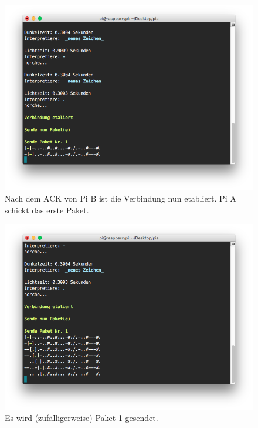 \documentclass[12pt, a4paper]{article}
\begin{document}
\newpage
\begin{figure}[H]
	\centering
	\includegraphics[width=1.0\textwidth]{sshot_15.png}
	\caption{Nach dem ACK von Pi B ist die Verbindung nun etabliert. Pi A schickt das erste Paket.}
\end{figure}

\newpage
\begin{figure}[H]
	\centering
	\includegraphics[width=1.0\textwidth]{sshot_16.png}
	\caption{Es wird (zufälligerweise) Paket 1 gesendet.}
\end{figure}
\end{document}
